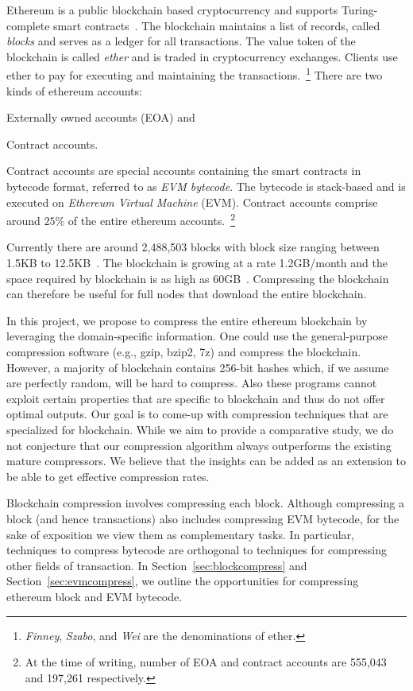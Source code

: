
Ethereum is a public blockchain based cryptocurrency and supports Turing-complete smart contracts~\cite{ethereum}.
The blockchain maintains a list of records, called \emph{blocks} and serves as a ledger for all transactions.
The value token of the blockchain is called \emph{ether} and 
is traded in cryptocurrency exchanges.
Clients use ether to pay for executing and maintaining the transactions.~\footnote{
\emph{Finney}, \emph{Szabo}, and \emph{Wei} are the denominations of ether.}
There are two kinds of ethereum accounts: 
\renewcommand\labelenumi{(\theenumi)}
\begin{enumerate*}
	\item Externally owned accounts (EOA) and
	\item Contract accounts.
\end{enumerate*}
Contract accounts are special accounts containing the smart contracts in bytecode format, referred to as \emph{EVM bytecode}.
The bytecode is stack-based and is executed on \emph{Ethereum Virtual Machine} (EVM).
Contract accounts comprise around $25\%$ of the entire ethereum accounts.~\footnote{
At the time of writing, number of EOA and contract accounts are 555,043 and 197,261 respectively.}  
 
Currently there are around 2,488,503 blocks with block size ranging between 1.5KB to 12.5KB~\cite{ethblocksize}.  
The blockchain is growing at a rate 1.2GB/month and
the space required by blockchain is as high as 60GB~\cite{ethdiskspace}.
Compressing the blockchain can therefore be useful for full nodes that download the entire blockchain.

In this project, we propose to compress the entire ethereum blockchain by leveraging the domain-specific information.
One could use the general-purpose compression software (e.g., gzip, bzip2, 7z) and compress the blockchain.
However, a majority of blockchain contains 256-bit hashes which, if we assume are perfectly random, will be hard to compress.
Also these programs cannot exploit certain properties that are specific to blockchain and thus do not offer optimal outputs.
Our goal is to come-up with compression techniques that  are specialized for blockchain.
While we aim to provide a comparative study, we do not conjecture that our compression algorithm always outperforms the existing mature compressors.
We believe that the insights can be added as an extension to be able to get effective compression rates.   

Blockchain compression involves compressing each block.
Although compressing a block (and hence transactions) also includes compressing EVM bytecode, 
for the sake of exposition we view them as complementary tasks. 
In particular, techniques to compress bytecode are orthogonal to techniques for compressing other fields of transaction.
In Section~\ref{sec:blockcompress} and 
Section~\ref{sec:evmcompress}, we   
outline the opportunities for compressing ethereum block and EVM bytecode. 

